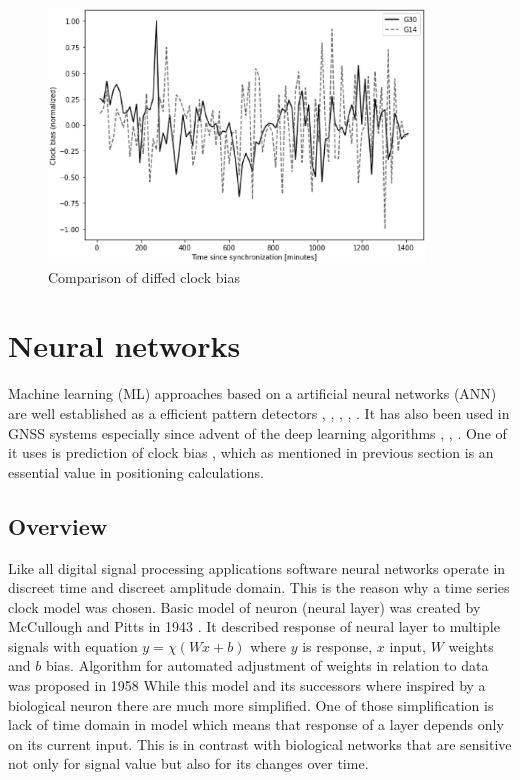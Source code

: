 \documentclass{kybernetika}
\begin{document}
\begin{figure}[ht] 
\centering
	\includegraphics[width=10cm]{figures/bias_normalized}
\caption{Comparison of diffed clock bias}
\label{fig:diffed_shifts}
\end{figure}

\FloatBarrier
\section{Neural networks}
Machine learning (ML) approaches based on a artificial neural networks (ANN) are
well established as a efficient pattern detectors \cite{Abiodun2019}, \cite{Miller1993},
\cite{Faraway2008}, \cite{Herbrich1999}, \cite{Khan2019}.
It has also been used in GNSS systems especially since advent of the deep learning
algorithms \cite{Wei2016}, \cite{Kim2019}, \cite{OrusPerez2019}.
One of it uses is prediction of clock bias \cite{Wang2017}, \cite{Indriyatmoko2008}
which as mentioned in previous section is an essential value in positioning calculations.

\subsection{Overview}  
Like all digital signal processing applications software neural networks operate in
discreet time and discreet amplitude domain. This is the reason why a time series clock model
was chosen. Basic model of neuron (neural layer) was created by McCullough and Pitts in 1943
\cite{McCulloch1943}. It described response of neural layer to multiple signals with
equation $y= \chi (W\dot x+b)$ where $y$ is response, $x$ input, $W$ weights and $b$ bias.
Algorithm for automated adjustment of weights in relation to data was proposed in 1958
While this model and its successors where inspired by a biological neuron there are much
more simplified. One of those simplification is lack of time domain in model which means
that response of a layer depends only on its current input.
This is in contrast with biological networks that are sensitive not only for signal value
but also for its changes over time.
\end{document}
